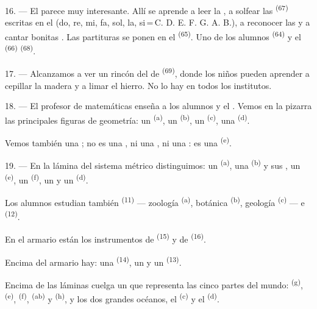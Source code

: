 16. --- El  parece muy interesante. Allí se aprende a
leer la , a solfear las 
\textsuperscript{(67)} escritas en el  (do, re, mi, fa, sol, la,
si\,=\,C. D. E. F. G. A. B.), a reconocer las  y a cantar
bonitas . Las partituras se ponen en el 
\textsuperscript{(65)}. Uno de los alumnos  \textsuperscript{(64)} y
el  \textsuperscript{(66)} 
\textsuperscript{(68)}.

17. --- Alcanzamos a ver un rincón del  de  \textsuperscript{(69)}, donde los niños pueden aprender a cepillar la
madera y a limar el hierro. No lo hay en todos los institutos.

\VUsaut{5.0mm}
\VUsaut{3.6mm}

18. --- El profesor de matemáticas enseña a los alumnos 
 y el . Vemos en la
pizarra las principales figuras de geometría: un 
\textsuperscript{(a)}, un  \textsuperscript{(b)}, un 
\textsuperscript{(c)}, una  \textsuperscript{(d)}.

Vemos también una ; no es una , ni una
, ni una : es una 
\textsuperscript{(e)}.

19. --- En la lámina del sistema métrico distinguimos: un 
\textsuperscript{(a)}, una  \textsuperscript{(b)} y sus , un
 \textsuperscript{(e)}, un  \textsuperscript{(f)}, un
 y un  \textsuperscript{(d)}.

Los alumnos estudian también  \textsuperscript{(11)} ---
zoología \textsuperscript{(a)}, botánica \textsuperscript{(b)}, geología \textsuperscript{(c)} ---
e  \textsuperscript{(12)}.

En el armario están los instrumentos de  \textsuperscript{(15)} y de
 \textsuperscript{(16)}.

Encima del armario hay: una  \textsuperscript{(14)}, un  y
un  \textsuperscript{(13)}.

Encima de las láminas cuelga un  que representa las cinco
partes del mundo:  \textsuperscript{(g)},  \textsuperscript{(e)},
 \textsuperscript{(f)},  \textsuperscript{(ab)} y
 \textsuperscript{(h)}, y los dos grandes océanos, el
 \textsuperscript{(c)} y el  \textsuperscript{(d)}.
\VUsaut{6.0mm}
\VUfilet{22mm}
